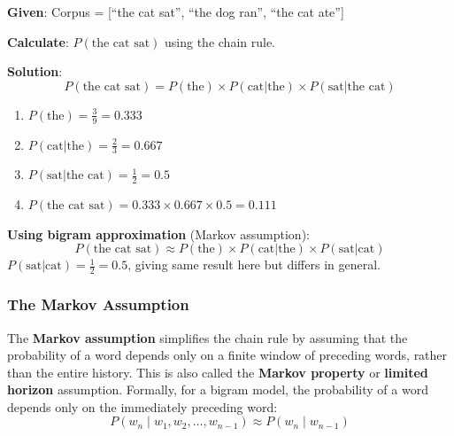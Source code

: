 \documentclass[11pt,a4paper]{article}
\begin{document}
\begin{center}
\end{center}

\begin{tcolorbox}[colback=yellow!5!white,colframe=yellow!75!black,title=\textbf{Worked Example: Chain Rule Step-by-Step}]
\textbf{Given}: Corpus = [``the cat sat'', ``the dog ran'', ``the cat ate'']

\textbf{Calculate}: $P(\text{the cat sat})$ using the chain rule.

\textbf{Solution}:
\[
P(\text{the cat sat}) = P(\text{the}) \times P(\text{cat}|\text{the}) \times P(\text{sat}|\text{the cat})
\]
\begin{enumerate}
    \item $P(\text{the}) = \frac{3}{9} = 0.333$
    \item $P(\text{cat}|\text{the}) = \frac{2}{3} = 0.667$
    \item $P(\text{sat}|\text{the cat}) = \frac{1}{2} = 0.5$
    \item $P(\text{the cat sat}) = 0.333 \times 0.667 \times 0.5 = 0.111$
\end{enumerate}

\textbf{Using bigram approximation} (Markov assumption):
\[
P(\text{the cat sat}) \approx P(\text{the}) \times P(\text{cat}|\text{the}) \times P(\text{sat}|\text{cat})
\]
$P(\text{sat}|\text{cat}) = \frac{1}{2} = 0.5$, giving same result here but differs in general.
\end{tcolorbox}

\subsubsection{The Markov Assumption}

The \textbf{Markov assumption} simplifies the chain rule by assuming that the probability of a word depends only on a finite window of preceding words, rather than the entire history. This is also called the \textbf{Markov property} or \textbf{limited horizon} assumption. Formally, for a bigram model, the probability of a word depends only on the immediately preceding word:
\[
P(w_n \mid w_1, w_2, \ldots, w_{n-1}) \approx P(w_n \mid w_{n-1})
\]
\end{document}
